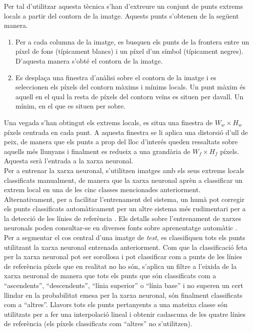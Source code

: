 Per tal d'utilitzar aquesta tècnica s'han d'extreure un conjunt de punts extrems locals a partir del contorn de la imatge. Aquests punts s'obtenen de la següent manera.
\begin{enumerate}
\item Per a cada columna de la imatge, es busquen els punts de la frontera entre un píxel de fons (típicament blancs) i un píxel d'un símbol (típicament negres). D'aquesta manera s'obté el contorn de la imatge.
\item Es desplaça una finestra d'anàlisi sobre el contorn de la imatge i es seleccionen els píxels del contorn màxims i mínims locals. Un punt màxim és aquell en el qual la resta de píxels del contorn veïns es situen per davall. Un mínim, en el que es situen per sobre.
\end{enumerate}

Una vegada s'han obtingut els extrems locals, es situa una finestra de $W_w \times H_w$ píxels centrada en cada punt. A aquesta finestra se li aplica una distorsió d'ull de peix, de manera que els punts a prop del lloc d'interés queden ressaltats sobre aquells més llunyans i finalment es redueix a una grandària de $W_f \times H_f$ píxels. Aquesta serà l'entrada a la xarxa neuronal.\\

Per a entrenar la xarxa neuronal, s'utilitzen imatges amb els seus extrems locals classificats manualment, de manera que la xarxa neuronal aprèn a classificar un extrem local en una de les cinc classes mencionades anteriorment. Alternativament, per a facilitar l'entrenament del sistema, un humà pot corregir els punts classificats automàticament per un altre sistema més rudimentari per a la detecció de les línies de referència \cite{DBLP:conf/pris/Gorbe-MoyaEZB08}. Els detalls sobre l'entrenament de xarxes neuronals poden consultar-se en diverses fonts sobre aprenentatge automàtic \cite{DH73,bishop2006pattern,murphy2012machine}.\\

Per a segmentar el cos central d'una imatge de \emph{test}, es classifiquen tots els punts utilitzant la xarxa neuronal entrenada anteriorment. Com que la classificació feta per la xarxa neuronal pot ser sorollosa i pot classificar com a punts de les línies de referència píxels que en realitat no ho són, s'aplica un filtre a l'eixida de la xarxa neuronal de manera que tots els punts que són classificats com a ``ascendents'', ``descendents'', ``línia superior'' o ``línia base'' i no superen un cert llindar en la probabilitat emesa per la xarxa neuronal, són finalment classificats com a ``altres''. Llavors tots els punts pertanyents a una mateixa classe són utilitzats per a fer una interpolació lineal i obtenir cadascuna de les quatre línies de referència (els píxels classificats com ``altres'' no s'utilitzen).\\

